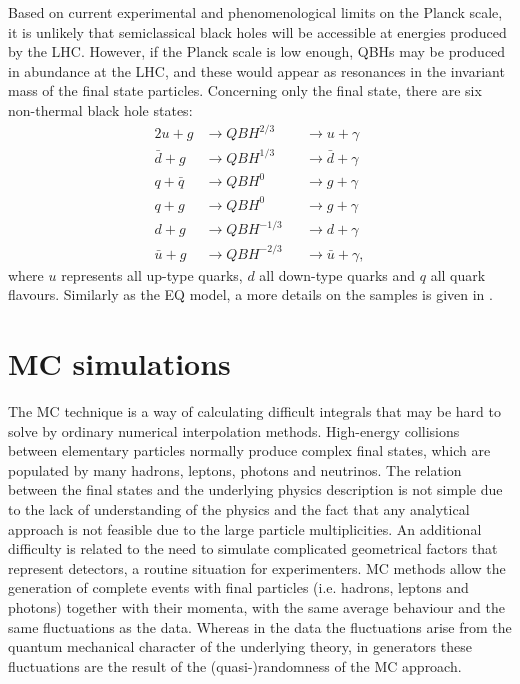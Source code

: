 Based on current experimental and phenomenological limits on the Planck scale, it is unlikely that semiclassical black holes will be accessible at energies produced by the \ac{LHC}. However, if the Planck scale is low enough, \acp{QBH} may be produced in abundance at the \ac{LHC}, and these would appear as resonances in the invariant mass of the final state particles. Concerning only the \gammajet final state, there are six non-thermal black hole states:
\begin{alignat*}{2}
    u + g       & \to QBH^{2/3}     && \to u + \gamma\\
    \bar{d} + g & \to QBH^{1/3}     && \to \bar{d} + \gamma\\
    q + \bar{q} & \to QBH^{0}       && \to g + \gamma\\
    q + g       & \to QBH^{0}       && \to g + \gamma\\
    d + g       & \to QBH^{-1/3}    && \to d + \gamma\\
    \bar{u} + g & \to QBH^{-2/3}    && \to \bar{u} + \gamma,
\end{alignat*}
where \(u\) represents all up-type quarks, \(d\) all down-type quarks and \(q\) all quark flavours. Similarly as the \ac{EQ} model, a more details on the samples is given in \Ch{\ref{ch:samples}}.












\section{\acf{MC} simulations}
\label{sec:theory:mc_simulation}


The \ac{MC} technique is a way of calculating difficult integrals that may be hard to solve by ordinary numerical interpolation methods. High-energy collisions between elementary particles normally produce complex final states, which are populated by many hadrons, leptons, photons and neutrinos. The relation between the final states and the underlying physics description is not simple due to the lack of understanding of the physics and the fact that any analytical approach is not feasible due to the large particle multiplicities. An additional difficulty is related to the need to simulate complicated geometrical factors that represent detectors, a routine situation for experimenters.
\ac{MC} methods allow the generation of complete events with final particles (i.e. hadrons, leptons and photons) together with their momenta, with the same average behaviour and the same fluctuations as the data. Whereas in the data the fluctuations arise from the quantum mechanical character of the underlying theory, in generators these fluctuations are the result of the (quasi-)randomness of the \ac{MC} approach.

